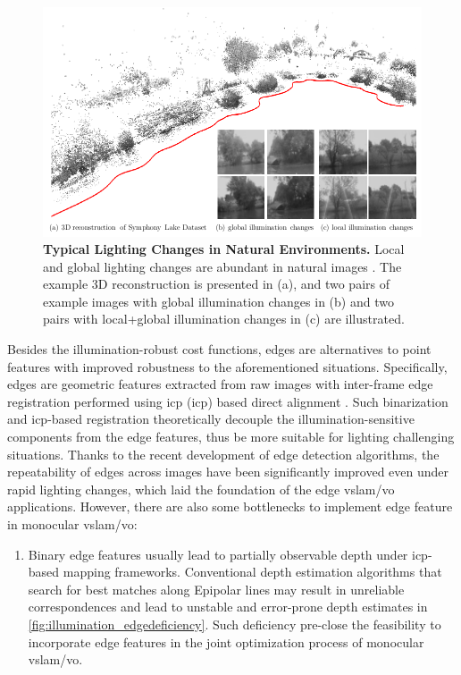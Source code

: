 \begin{figure}[t] 
  	\centering
  	\includegraphics[width=\linewidth]{figures/illumination/typical_lighting_changes.pdf}
    \caption[Typical Lighting Changes in Natural Environments]{ \textbf{Typical Lighting Changes in Natural Environments.} Local and global lighting changes are abundant in natural images \cite{griffith2017symphony}. The example 3D reconstruction is presented in (a), and two pairs of example images with global illumination changes in (b) and two pairs with local+global illumination changes in (c) are illustrated. 
	\label{fig:illumination_typicalnoise}}
\end{figure}

Besides the illumination-robust cost functions, edges are alternatives to point features with improved robustness to the aforementioned situations. 
Specifically, edges are geometric features extracted from raw images with inter-frame edge registration performed using \acrlong{icp} (\acrshort{icp}) based direct alignment \cite{kneip2015sdicp} \cite{zhou2017semi} \cite{zhou2018canny}.
Such binarization and \acrshort{icp}-based registration theoretically decouple the illumination-sensitive components from the edge features, thus be more suitable for lighting challenging situations. 
Thanks to the recent development of edge detection algorithms, the repeatability of edges across images have been significantly improved even under rapid lighting changes, which laid the foundation of the edge \acrshort{vslam}/\acrshort{vo} applications. 
However, there are also some bottlenecks to implement edge feature in monocular \acrshort{vslam}/\acrshort{vo}:
\begin{enumerate}
	\item Binary edge features usually lead to partially observable depth under \acrshort{icp}-based mapping frameworks. 
Conventional depth estimation algorithms that search for best matches along Epipolar lines may result in unreliable correspondences and lead to unstable and error-prone depth estimates in \ref{fig:illumination_edgedeficiency}. 
Such deficiency pre-close the feasibility to incorporate edge features in the joint optimization process of monocular \acrshort{vslam}/\acrshort{vo}. 
\end{enumerate}

